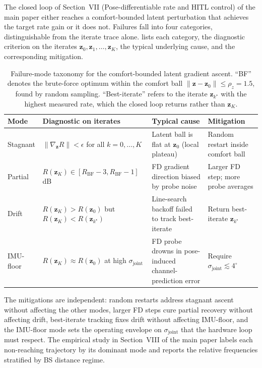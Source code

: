 \documentclass[10pt,journal,twocolumn]{IEEEtran}
\theoremstyle{plain}
\theoremstyle{definition}
\begin{document}
The closed loop of Section~VII (Pose-differentiable rate and HITL control) of the main paper either
reaches a comfort-bounded latent perturbation that achieves the
target rate gain or it does not. Failures fall into four categories,
distinguishable from the iterate trace alone.
 lists each category, the diagnostic
criterion on the iterates $\bm{z}_0, \bm{z}_1, \ldots, \bm{z}_K$,
the typical underlying cause, and the corresponding mitigation.

\begin{table}[!t]
\centering
\caption{Failure-mode taxonomy for the comfort-bounded latent
gradient ascent. ``BF'' denotes the brute-force optimum within the
comfort ball $\|\bm{z} - \bm{z}_0\| \leq \rho_z = 1.5$, found by
random sampling. ``Best-iterate'' refers to the iterate
$\bm{z}_{k^\star}$ with the highest measured rate, which the closed
loop returns rather than $\bm{z}_K$.}
\label{tab:failure-modes}
\footnotesize
\begin{tabular}{@{}llll@{}}
\toprule
Mode & Diagnostic on iterates & Typical cause & Mitigation \\
\midrule
Stagnant
  & $\|\nabla_{\bm{z}} R\| < \epsilon$ for all $k = 0, \ldots, K$
  & Latent ball is flat at $\bm{z}_0$ (local plateau)
  & Random restart inside comfort ball \\[2pt]
Partial
  & $R(\bm{z}_K) \in [R_\mathrm{BF} - 3, R_\mathrm{BF} - 1]\,$dB
  & FD gradient direction biased by probe noise
  & Larger FD step; more probe averages \\[2pt]
Drift
  & $R(\bm{z}_K) > R(\bm{z}_0)$ but $R(\bm{z}_K) < R(\bm{z}_{k^\star})$
  & Line-search backoff failed to track best-iterate
  & Return best-iterate $\bm{z}_{k^\star}$ \\[2pt]
IMU-floor
  & $R(\bm{z}_K) \approx R(\bm{z}_0)$ at high $\sigma_\mathrm{joint}$
  & FD probe drowns in pose-induced channel-prediction error
  & Require $\sigma_\mathrm{joint} \lesssim 4^{\circ}$ \\
\bottomrule
\end{tabular}
\end{table}

The mitigations are independent: random restarts address stagnant
ascent without affecting the other modes, larger FD steps cure
partial recovery without affecting drift, best-iterate tracking
fixes drift without affecting IMU-floor, and the IMU-floor mode
sets the operating envelope on $\sigma_\mathrm{joint}$ that the
hardware loop must respect. The empirical study in
Section~VIII of the main paper labels each non-reaching
trajectory by its dominant mode and reports the relative
frequencies stratified by BS distance regime.
\end{document}
